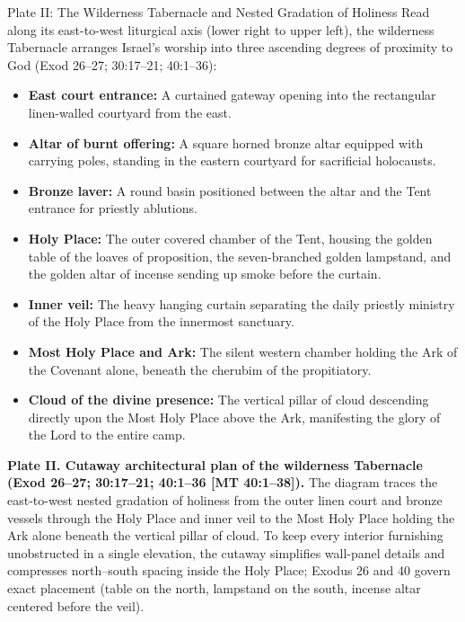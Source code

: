 \begin{studybox}{Plate II: The Wilderness Tabernacle and Nested Gradation of Holiness}
Read along its east-to-west liturgical axis (lower right to upper left), the wilderness Tabernacle arranges Israel's worship into three ascending degrees of proximity to God (Exod 26--27; 30:17--21; 40:1--36):
\begin{itemize}
  \item \textbf{East court entrance:} A curtained gateway opening into the rectangular linen-walled courtyard from the east.
  \item \textbf{Altar of burnt offering:} A square horned bronze altar equipped with carrying poles, standing in the eastern courtyard for sacrificial holocausts.
  \item \textbf{Bronze laver:} A round basin positioned between the altar and the Tent entrance for priestly ablutions.
  \item \textbf{Holy Place:} The outer covered chamber of the Tent, housing the golden table of the loaves of proposition, the seven-branched golden lampstand, and the golden altar of incense sending up smoke before the curtain.
  \item \textbf{Inner veil:} The heavy hanging curtain separating the daily priestly ministry of the Holy Place from the innermost sanctuary.
  \item \textbf{Most Holy Place and Ark:} The silent western chamber holding the Ark of the Covenant alone, beneath the cherubim of the propitiatory.
  \item \textbf{Cloud of the divine presence:} The vertical pillar of cloud descending directly upon the Most Holy Place above the Ark, manifesting the glory of the Lord to the entire camp.
\end{itemize}
\end{studybox}
\fi
\begin{platecaption}
\textbf{Plate II. Cutaway architectural plan of the wilderness Tabernacle (Exod 26--27; 30:17--21; 40:1--36 [MT 40:1--38]).} The diagram traces the east-to-west nested gradation of holiness from the outer linen court and bronze vessels through the Holy Place and inner veil to the Most Holy Place holding the Ark alone beneath the vertical pillar of cloud. To keep every interior furnishing unobstructed in a single elevation, the cutaway simplifies wall-panel details and compresses north--south spacing inside the Holy Place; Exodus 26 and 40 govern exact placement (table on the north, lampstand on the south, incense altar centered before the veil).
\end{platecaption}

